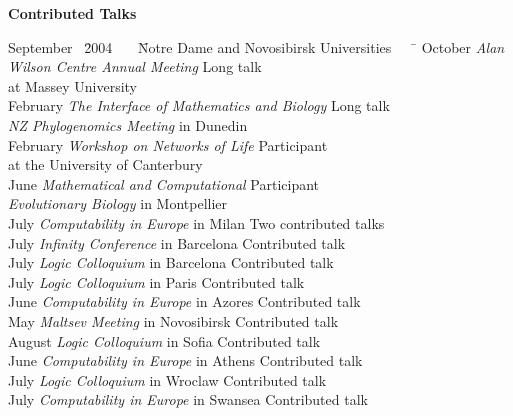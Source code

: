 \documentclass[12pt]{article}
\begin{document}
\centerline{\bf Contributed Talks}
\begin{tabbing}
September \ \=2004 \ \ \ \= Notre Dame and Novosibirsk Universities \ \ \ \= \kill
October                     \> {\em Alan Wilson Centre Annual Meeting}                                      \> Long talk\\
                                        \>                \>  at Massey University  \> \\
February                    \> {\em The Interface of Mathematics and Biology}                                      \> Long talk\\
                                        \>                \> {\em NZ Phylogenomics Meeting} in Dunedin  \> \\
February              \>  {\em Workshop on Networks of Life}                                     \> Participant \\
            \>              \>  at the University of Canterbury                                      \> \\
June                    \> {\em Mathematical and Computational}                                      \> Participant\\
                                        \>                \> {\em Evolutionary Biology} in Montpellier \> \\
July                    \> {\em Computability in Europe} in Milan                                       \> Two contributed talks\\
July                     \> {\em Infinity Conference} in Barcelona                                              \> Contributed talk\\
July                     \> {\em Logic Colloquium} in Barcelona                                              \> Contributed talk\\
July                     \> {\em Logic Colloquium} in Paris                                                     \> Contributed talk\\
June                    \> {\em Computability in Europe} in Azores                                       \> Contributed talk\\
May                     \> {\em Maltsev Meeting} in Novosibirsk                                             \> Contributed talk\\
August          \> {\em Logic Colloquium} in Sofia                                                      \> Contributed talk\\
June                  \> {\em Computability in Europe} in Athens                                         \> Contributed talk\\
July                    \> {\em Logic Colloquium} in Wroclaw                                               \> Contributed talk\\
July                    \> {\em Computability in Europe} in Swansea                                      \> Contributed talk\\
\end{tabbing}
\end{document}
